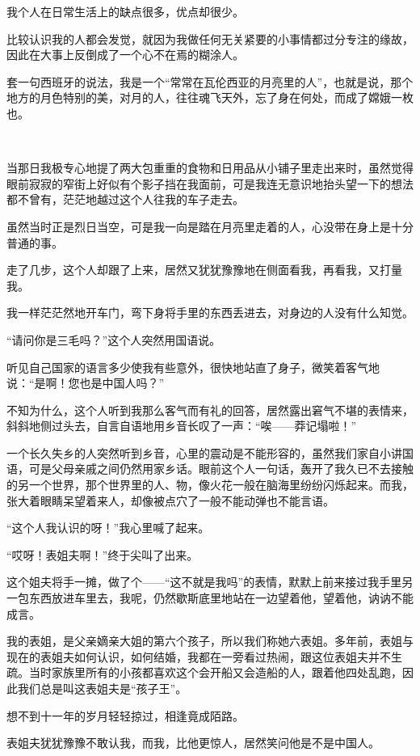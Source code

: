 \par 我个人在日常生活上的缺点很多，优点却很少。
\par 比较认识我的人都会发觉，就因为我做任何无关紧要的小事情都过分专注的缘故，因此在大事上反倒成了一个心不在焉的糊涂人。
\par 套一句西班牙的说法，我是一个“常常在瓦伦西亚的月亮里的人”，也就是说，那个地方的月色特别的美，对月的人，往往魂飞天外，忘了身在何处，而成了嫦娥一枚也。
\par  
\par 当那日我极专心地提了两大包重重的食物和日用品从小铺子里走出来时，虽然觉得眼前寂寂的窄街上好似有个影子挡在我面前，可是我连无意识地抬头望一下的想法都不曾有，茫茫地越过这个人往我的车子走去。
\par 虽然当时正是烈日当空，可是我一向是踏在月亮里走着的人，心没带在身上是十分普通的事。
\par 走了几步，这个人却跟了上来，居然又犹犹豫豫地在侧面看我，再看我，又打量我。
\par 我一样茫茫然地开车门，弯下身将手里的东西丢进去，对身边的人没有什么知觉。
\par “请问你是三毛吗？”这个人突然用国语说。
\par 听见自己国家的语言多少使我有些意外，很快地站直了身子，微笑着客气地说：“是啊！您也是中国人吗？”
\par 不知为什么，这个人听到我那么客气而有礼的回答，居然露出窘气不堪的表情来，斜斜地侧过头去，自言自语地用乡音长叹了一声：“唉——莽记塌啦！”
\par 一个长久失乡的人突然听到乡音，心里的震动是不能形容的，虽然我们家自小讲国语，可是父母亲戚之间仍然用家乡话。眼前这个人一句话，轰开了我久已不去接触的另一个世界，那个世界里的人、物，像火花一般在脑海里纷纷闪烁起来。而我，张大着眼睛呆望着来人，却像被点穴了一般不能动弹也不能言语。
\par “这个人我认识的呀！”我心里喊了起来。
\par “哎呀！表姐夫啊！”终于尖叫了出来。
\par 这个姐夫将手一摊，做了个——“这不就是我吗”的表情，默默上前来接过我手里另一包东西放进车里去，我呢，仍然歇斯底里地站在一边望着他，望着他，讷讷不能成言。
\par 我的表姐，是父亲嫡亲大姐的第六个孩子，所以我们称她六表姐。多年前，表姐与现在的表姐夫如何认识，如何结婚，我都在一旁看过热闹，跟这位表姐夫并不生疏。当时家族里所有的小孩都喜欢这个会开船又会造船的人，跟着他四处乱跑，因此我们总是叫这表姐夫是“孩子王”。
\par 想不到十一年的岁月轻轻掠过，相逢竟成陌路。
\par 表姐夫犹犹豫豫不敢认我，而我，比他更惊人，居然笑问他是不是中国人。
